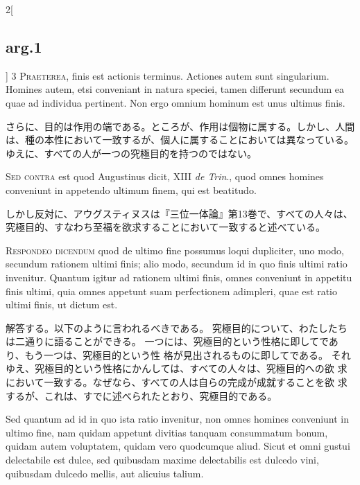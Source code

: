 \documentclass[paper=a4paper,fontsize=10pt,jafontsize=9pt,titlepage]{jlreq}
\begin{document}
\begin{paracol}{2}[\subsection{arg.1}]
{\scshape 3 Praeterea}, finis est actionis
terminus. Actiones autem sunt singularium. Homines autem, etsi
conveniant in natura speciei, tamen differunt secundum ea quae ad
individua pertinent. Non ergo omnium hominum est unus ultimus finis.

\switchcolumn

さらに、目的は作用の端である。ところが、作用は個物に属する。しかし、人間
 は、種の本性において一致するが、個人に属することにおいては異なっている。
 ゆえに、すべての人が一つの究極目的を持つのではない。

\switchcolumn*[\subsection{s.c.}]

{\scshape Sed contra} est quod Augustinus dicit,
XIII {\itshape de Trin}., quod omnes homines conveniunt in appetendo ultimum finem,
qui est beatitudo.

\switchcolumn

しかし反対に、アウグスティヌスは『三位一体論』第13巻で、すべての人々は、
 究極目的、すなわち至福を欲求することにおいて一致すると述べている。


{\scshape Respondeo dicendum} quod de ultimo fine
possumus loqui dupliciter, uno modo, secundum rationem ultimi finis;
alio modo, secundum id in quo finis ultimi ratio invenitur. Quantum
igitur ad rationem ultimi finis, omnes conveniunt in appetitu finis
ultimi, quia omnes appetunt suam perfectionem adimpleri, quae est ratio
ultimi finis, ut dictum est.

\switchcolumn

解答する。以下のように言われるべきである。
究極目的について、わたしたちは二通りに語ることができる。
一つには、究極目的という性格に即してであり、もう一つは、究極目的という性
 格が見出されるものに即してである。
それゆえ、究極目的という性格にかんしては、すべての人々は、究極目的への欲
 求において一致する。なぜなら、すべての人は自らの完成が成就することを欲
 求するが、これは、すでに述べられたとおり、究極目的である。

\switchcolumn*

Sed quantum ad id in quo ista ratio
invenitur, non omnes homines conveniunt in ultimo fine, nam quidam
appetunt divitias tanquam consummatum bonum, quidam autem voluptatem,
quidam vero quodcumque aliud. Sicut et omni gustui delectabile est
dulce, sed quibusdam maxime delectabilis est dulcedo vini, quibusdam
dulcedo mellis, aut alicuius talium.


\end{paracol}
\end{document}

